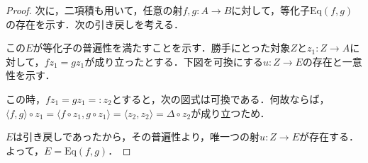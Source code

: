 \documentclass[uplatex, 12pt, dvipdfmx]{jsarticle}
\begin{document}
\begin{proof}
    次に，二項積も用いて，任意の射$f,g:A\to B$に対して，等化子$\mathrm{Eq}(f,g)$の存在を示す．次の引き戻しを考える．
    \begin{center}
    \end{center}
    この$E$が等化子の普遍性を満たすことを示す．勝手にとった対象$Z$と$z_1:Z\to A$に対して，$fz_1=gz_1$が成り立ったとする．下図を可換にする$u:Z\to E$の存在と一意性を示す．
    \begin{center}
    \end{center}
    この時，$fz_1=gz_1=:z_2$とすると，次の図式は可換である．何故ならば，$\langle f,g\rangle\circ z_1 = \langle f\circ z_1,g\circ z_1\rangle=\langle z_2,z_2\rangle =\Delta\circ z_2$が成り立つため．
    \begin{center}
    \end{center}
    $E$は引き戻しであったから，その普遍性より，唯一つの射$u:Z\to E$が存在する．よって，$E=\mathrm{Eq}(f,g)$．
\end{proof}
\end{document}
